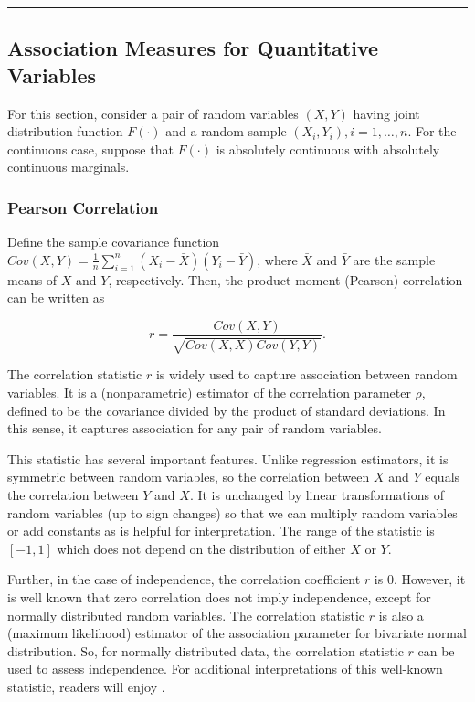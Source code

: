 \documentclass[]{book}
\theoremstyle{definition}
\theoremstyle{definition}
\theoremstyle{definition}
\theoremstyle{remark}
\begin{document}
\begin{center}\rule{0.5\linewidth}{\linethickness}\end{center}

\subsection{Association Measures for Quantitative
Variables}\label{association-measures-for-quantitative-variables}

For this section, consider a pair of random variables \((X,Y)\) having
joint distribution function \(F(\cdot)\) and a random sample
\((X_i,Y_i), i=1, \ldots, n\). For the continuous case, suppose that
\(F(\cdot)\) is absolutely continuous with absolutely continuous
marginals.

\subsubsection{Pearson Correlation}\label{pearson-correlation}

Define the sample covariance function
\(Cov(X,Y) = \frac{1}{n} \sum_{i=1}^n (X_i - \bar{X})(Y_i - \bar{Y})\),
where \(\bar{X}\) and \(\bar{Y}\) are the sample means of \(X\) and
\(Y\), respectively. Then, the product-moment (Pearson) correlation can
be written as

\begin{equation*}
r = \frac{Cov(X,Y)}{\sqrt{Cov(X,X) Cov(Y,Y)}}.
\end{equation*}

The correlation statistic \(r\) is widely used to capture association
between random variables. It is a (nonparametric) estimator of the
correlation parameter \(\rho\), defined to be the covariance divided by
the product of standard deviations. In this sense, it captures
association for any pair of random variables.

This statistic has several important features. Unlike regression
estimators, it is symmetric between random variables, so the correlation
between \(X\) and \(Y\) equals the correlation between \(Y\) and \(X\).
It is unchanged by linear transformations of random variables (up to
sign changes) so that we can multiply random variables or add constants
as is helpful for interpretation. The range of the statistic is
\([-1,1]\) which does not depend on the distribution of either \(X\) or
\(Y\).

Further, in the case of independence, the correlation coefficient \(r\)
is 0. However, it is well known that zero correlation does not imply
independence, except for normally distributed random variables. The
correlation statistic \(r\) is also a (maximum likelihood) estimator of
the association parameter for bivariate normal distribution. So, for
normally distributed data, the correlation statistic \(r\) can be used
to assess independence. For additional interpretations of this
well-known statistic, readers will enjoy \citep{lee1988thirteen}.
\end{document}
